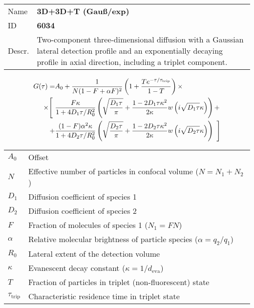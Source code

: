\noindent \begin{tabular}{lp{}}
Name & \textbf{3D+3D+T (Gauß/exp)} \\ 
ID & \textbf{6034} \\ 
Descr. &  Two-component three-dimensional diffusion with a Gaussian lateral detection profile and an exponentially decaying profile in axial direction, including a triplet component. \\
\end{tabular}
\begin{align}
G(\tau) = &A_0 + \frac{1}{N (1-F + \alpha F)^2} \left(1 + \frac{T e^{-\tau/\tau_\mathrm{trip}}}{1-T}  \right)  \times \\
\notag \times  \Bigg[ \,\, & 
\frac{F \kappa}{1+ 4 D_1 \tau/R_0^2} 
\left( \sqrt{\frac{D_1 \tau}{\pi}} + \frac{1 - 2 D_1 \tau \kappa^2}{2 \kappa}  w\left(i \sqrt{D_1 \tau} \kappa\right) \right) + \\
 \notag + &
\frac{(1-F) \alpha^2 \kappa}{1+ 4 D_2 \tau/R_0^2} 
\left( \sqrt{\frac{D_2 \tau}{\pi}} + \frac{1 - 2 D_2 \tau \kappa^2}{2 \kappa}  w\left(i \sqrt{D_2 \tau} \kappa\right) \right) \,\, \Bigg]
\end{align} 
\begin{center}
\begin{tabular}{ll}
$A_0$ & Offset \\ 
$N$ & Effective number of particles in confocal volume ($N = N_1+N_2$) \\ 
$D_1$ &  Diffusion coefficient of species 1 \\ 
$D_2$ &  Diffusion coefficient of species 2 \\ 
$F$ & Fraction of molecules of species 1 ($N_1 = F N$) \\
$\alpha$ & Relative molecular brightness of particle species ($ \alpha = q_2/q_1$) \\
$R_0$ & Lateral extent of the detection volume \\
$\kappa$ &  Evanescent decay constant ($\kappa = 1/d_\mathrm{eva}$)\\ 
$T$ &  Fraction of particles in triplet (non-fluorescent) state\\ 
$\tau_\mathrm{trip}$ &  Characteristic residence time in triplet state \\ 
\end{tabular}
\end{center}
\vspace{2em}



